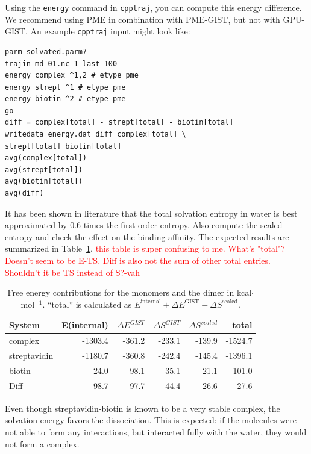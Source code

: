 \documentclass[9pt,tutorial]{livecoms}
\newcommand{\software}{\texttt}
\newcommand{\todo}{\textcolor{red}}
\newcommand\inlinecode{\texttt}
\begin{document}
Using the \inlinecode{energy} command in \software{cpptraj}, you can compute this energy difference.
We recommend using PME in combination with PME-GIST, but not with GPU-GIST\@.
An example \software{cpptraj} input might look like:
\begin{lstlisting}[style=cpptraj]
parm solvated.parm7
trajin md-01.nc 1 last 100
energy complex ^1,2 # etype pme
energy strept ^1 # etype pme
energy biotin ^2 # etype pme
go
diff = complex[total] - strept[total] - biotin[total]
writedata energy.dat diff complex[total] \
strept[total] biotin[total]
avg(complex[total])
avg(strept[total])
avg(biotin[total])
avg(diff)
\end{lstlisting}

It has been shown in literature \cite{Chen2021,Waibl2022-gist-solvents} that the total solvation entropy in water is best approximated by 0.6 times the first order entropy.
Also compute the scaled entropy and check the effect on the binding affinity.
The expected results are summarized in Table~\ref{tab_dg_monomers_dimer}.
\todo{this table is super confusing to me. What's "total"? Doesn't seem to be E-TS. Diff is also not the sum of other total entries. Shouldn't it be TS instead of S?-vah}
\begin{table}[h]
	\caption{Free energy contributions for the monomers and the dimer in kcal$\cdot$mol$^{-1}$. ``total'' is calculated as $E^\text{internal} + \Delta E^\text{GIST} - \Delta S^\text{scaled}$.}\label{tab_dg_monomers_dimer}
	\small
	\begin{tabular}{@{}lrrrrr@{}}
		\toprule
		System       & E(internal) & $\Delta E^\textit{GIST}$ & $\Delta S^\textit{GIST}$ & $\Delta S^\textit{scaled}$ & total \\
		\midrule
		complex      & -1303.4 & -361.2 & -233.1 & -139.9 & -1524.7 \\
		streptavidin & -1180.7 & -360.8 & -242.4 & -145.4 & -1396.1 \\
		biotin       & -24.0   &  -98.1 &  -35.1 &  -21.1 &  -101.0 \\
		Diff         & -98.7   &   97.7 &   44.4 &   26.6 &   -27.6 \\
		\bottomrule
	\end{tabular}
\end{table}

Even though streptavidin-biotin is known to be a very stable complex, the solvation energy favors the dissociation.
This is expected: if the molecules were not able to form any interactions, but interacted fully with the water, they would not form a complex.
\end{document}
